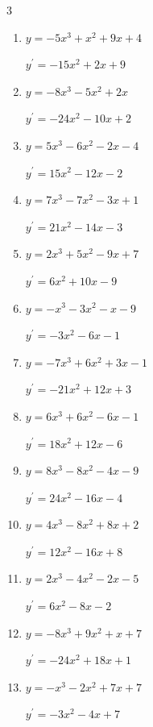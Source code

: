 \begin{multicols}{3}
\begin{enumerate}
  \item $y=-5x^{3}+x^{2}+9x+4$

        $\displaystyle y^{\prime}=-15x^{2}+2x+9$

  \item $y=-8x^{3}-5x^{2}+2x$

        $\displaystyle y^{\prime}=-24x^{2}-10x+2$

  \item $y=5x^{3}-6x^{2}-2x-4$

        $\displaystyle y^{\prime}=15x^{2}-12x-2$

  \item $y=7x^{3}-7x^{2}-3x+1$

        $\displaystyle y^{\prime}=21x^{2}-14x-3$

  \item $y=2x^{3}+5x^{2}-9x+7$

        $\displaystyle y^{\prime}=6x^{2}+10x-9$

  \item $y=-x^{3}-3x^{2}-x-9$

        $\displaystyle y^{\prime}=-3x^{2}-6x-1$

  \item $y=-7x^{3}+6x^{2}+3x-1$

        $\displaystyle y^{\prime}=-21x^{2}+12x+3$

  \item $y=6x^{3}+6x^{2}-6x-1$

        $\displaystyle y^{\prime}=18x^{2}+12x-6$

  \item $y=8x^{3}-8x^{2}-4x-9$

        $\displaystyle y^{\prime}=24x^{2}-16x-4$

  \item $y=4x^{3}-8x^{2}+8x+2$

        $\displaystyle y^{\prime}=12x^{2}-16x+8$

\columnbreak %

  \item $y=2x^{3}-4x^{2}-2x-5$

        $\displaystyle y^{\prime}=6x^{2}-8x-2$

  \item $y=-8x^{3}+9x^{2}+x+7$

        $\displaystyle y^{\prime}=-24x^{2}+18x+1$

  \item $y=-x^{3}-2x^{2}+7x+7$

        $\displaystyle y^{\prime}=-3x^{2}-4x+7$


\end{enumerate}
\end{multicols}
